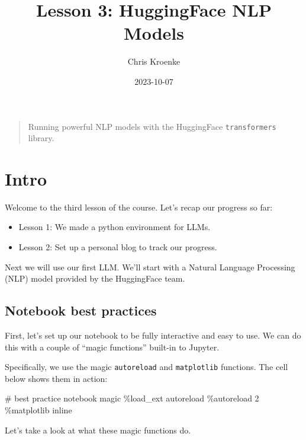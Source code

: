\documentclass[
  letterpaper,
  DIV=11,
  numbers=noendperiod]{scrartcl}
\title{Lesson 3: HuggingFace NLP Models}
\author{Chris Kroenke}
\date{2023-10-07}
\newenvironment{Shaded}{\begin{snugshade}}{\end{snugshade}}
\newcommand{\CommentTok}[1]{\textcolor[rgb]{0.37,0.37,0.37}{#1}}
\newcommand{\DecValTok}[1]{\textcolor[rgb]{0.68,0.00,0.00}{#1}}
\newcommand{\NormalTok}[1]{\textcolor[rgb]{0.00,0.23,0.31}{#1}}
\newcommand{\OperatorTok}[1]{\textcolor[rgb]{0.37,0.37,0.37}{#1}}
\providecommand{\tightlist}{%
  \setlength{\itemsep}{0pt}\setlength{\parskip}{0pt}}\usepackage{longtable,booktabs,array}
\renewcommand*\contentsname{Table of contents}
\newcommand\contentsname{Table of contents}
\begin{document}
\maketitle

\renewcommand*\contentsname{Table of contents}
{
\hypersetup{linkcolor=}
\setcounter{tocdepth}{3}
\tableofcontents
}
\begin{quote}
Running powerful NLP models with the HuggingFace \texttt{transformers}
library.
\end{quote}

\section{Intro}\label{intro}

Welcome to the third lesson of the course. Let's recap our progress so
far:

\begin{itemize}
\tightlist
\item
  Lesson 1: We made a python environment for LLMs.\\
\item
  Lesson 2: Set up a personal blog to track our progress.
\end{itemize}

Next we will use our first LLM. We'll start with a Natural Language
Processing (NLP) model provided by the HuggingFace team.

\subsection{Notebook best practices}\label{notebook-best-practices}

First, let's set up our notebook to be fully interactive and easy to
use. We can do this with a couple of ``magic functions'' built-in to
Jupyter.

Specifically, we use the magic \texttt{autoreload} and
\texttt{matplotlib} functions. The cell below shows them in action:

\begin{Shaded}
\begin{Highlighting}[]
\CommentTok{\# best practice notebook magic}
\OperatorTok{\%}\NormalTok{load\_ext autoreload}
\OperatorTok{\%}\NormalTok{autoreload }\DecValTok{2}
\OperatorTok{\%}\NormalTok{matplotlib inline}
\end{Highlighting}
\end{Shaded}

Let's take a look at what these magic functions do.
\end{document}
